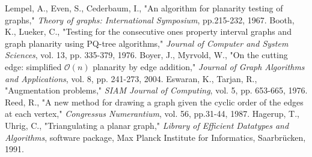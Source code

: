 \documentclass[letterpaper, 12pt]{amsart}
\theoremstyle{definition}
\theoremstyle{definition}
\theoremstyle{thm}
\theoremstyle{definition}
\begin{document}
\begin{thebibliography}{21}
	Lempel, A., Even, S., Cederbaum, I., "An algorithm for planarity testing of
	graphs," \textit{Theory of graphs: International Symposium}, pp.215-232,
	1967.
	Booth, K., Lueker, C., "Testing for the consecutive ones property interval
	graphs and graph planarity using PQ-tree algorithms," \textit{Journal of
	Computer and System Sciences}, vol. 13, pp. 335-379, 1976.
	Boyer, J., Myrvold, W., "On the cutting edge: simplified $\mathcal{O}(n)$ planarity by
	edge addition," \textit{Journal of Graph Algorithms and Applications}, vol.
	8, pp. 241-273, 2004.
	Eswaran, K., Tarjan, R., "Augmentation problems," \textit{SIAM Journal of
	Computing}, vol. 5, pp. 653-665, 1976.
	Reed, R., "A new method for drawing a graph given the cyclic order of the
	edges at each vertex," \textit{Congressus Numerantium}, vol. 56, pp.31-44,
	1987.
	Hagerup, T., Uhrig, C., "Triangulating a planar graph," \textit{Library of
	Efficient Datatypes and Algorithms}, software package, Max Planck Institute
	for Informatics, Saarbr{\"u}cken, 1991.
\end{thebibliography}
\end{document}
